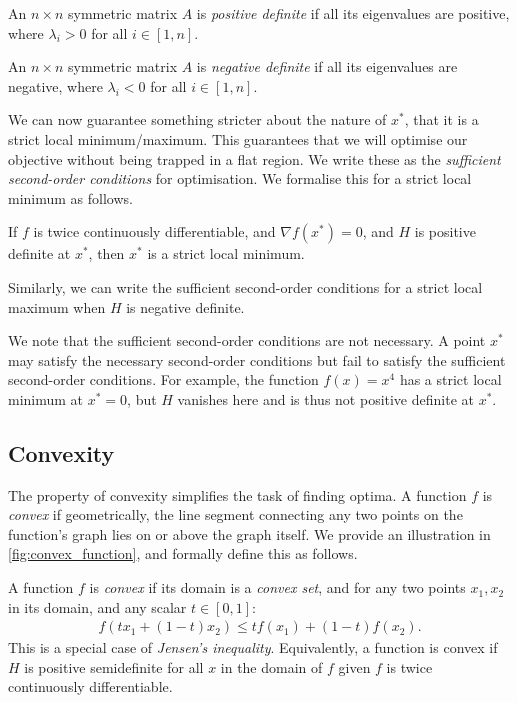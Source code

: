 \begin{definition}
    An $n \times n$ symmetric matrix $A$ is \textit{positive definite} if all its eigenvalues are positive, where $\lambda_i > 0$ for all $i \in [1, n]$.
\end{definition}
\begin{definition}
    An $n \times n$ symmetric matrix $A$ is \textit{negative definite} if all its eigenvalues are negative, where $\lambda_i < 0$ for all $i \in [1, n]$.
\end{definition}

We can now guarantee something stricter about the nature of $x^*$, that it is a strict local minimum/maximum. This guarantees that we will optimise our objective without being trapped in a flat region. We write these as the \textit{sufficient second-order conditions} for optimisation. We formalise this for a strict local minimum as follows.
\begin{definition}
    If $f$ is twice continuously differentiable, and $\nabla f(x^*) = 0$, and $H$ is positive definite at $x^*$, then $x^*$ is a strict local minimum.
\end{definition}
Similarly, we can write the sufficient second-order conditions for a strict local maximum when $H$ is negative definite.

We note that the sufficient second-order conditions are not necessary. A point $x^*$ may satisfy the necessary second-order conditions but fail to satisfy the sufficient second-order conditions. For example, the function $f(x) = x^4$ has a strict local minimum at $x^* = 0$, but $H$ vanishes here and is thus not positive definite at $x^*$. 

\subsection{Convexity}
\label{ssec:convexity}

The property of convexity simplifies the task of finding optima. A function $f$ is \textit{convex} if geometrically, the line segment connecting any two points on the function's graph lies on or above the graph itself. We provide an illustration in \cref{fig:convex_function}, and formally define this as follows.

\begin{definition}
    A function $f$ is \textit{convex} if its domain is a \textit{convex set}, and for any two points $x_1, x_2$ in its domain, and any scalar $t \in [0, 1]$:
    \begin{align}
        f(t x_1 + (1-t)x_2) \leq t f(x_1) + (1-t)f(x_2).
    \end{align}
    This is a special case of \textit{Jensen's inequality}. Equivalently, a function is convex if $H$ is positive semidefinite for all $x$ in the domain of $f$ given $f$ is twice continuously differentiable.
\end{definition}


